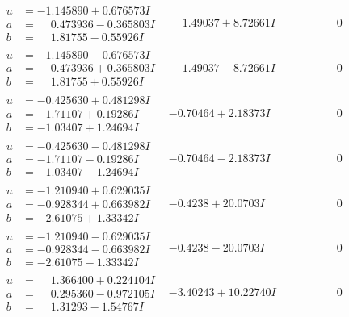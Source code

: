 \documentclass[1p]{elsarticle_modified}
\theoremstyle{definition}
\begin{document}
$$\begin{array}{c|c|c}
\begin{aligned}
u &= -1.145890 + 0.676573 I \\
a &= \phantom{-}0.473936 - 0.365803 I \\
b &= \phantom{-}1.81755 - 0.55926 I\end{aligned}
 & \phantom{-}1.49037 + 8.72661 I & \phantom{-0.000000 } 0 \\ \hline\begin{aligned}
u &= -1.145890 - 0.676573 I \\
a &= \phantom{-}0.473936 + 0.365803 I \\
b &= \phantom{-}1.81755 + 0.55926 I\end{aligned}
 & \phantom{-}1.49037 - 8.72661 I & \phantom{-0.000000 } 0 \\ \hline\begin{aligned}
u &= -0.425630 + 0.481298 I \\
a &= -1.71107 + 0.19286 I \\
b &= -1.03407 + 1.24694 I\end{aligned}
 & -0.70464 + 2.18373 I & \phantom{-0.000000 } 0 \\ \hline\begin{aligned}
u &= -0.425630 - 0.481298 I \\
a &= -1.71107 - 0.19286 I \\
b &= -1.03407 - 1.24694 I\end{aligned}
 & -0.70464 - 2.18373 I & \phantom{-0.000000 } 0 \\ \hline\begin{aligned}
u &= -1.210940 + 0.629035 I \\
a &= -0.928344 + 0.663982 I \\
b &= -2.61075 + 1.33342 I\end{aligned}
 & -0.4238 + 20.0703 I & \phantom{-0.000000 } 0 \\ \hline\begin{aligned}
u &= -1.210940 - 0.629035 I \\
a &= -0.928344 - 0.663982 I \\
b &= -2.61075 - 1.33342 I\end{aligned}
 & -0.4238 - 20.0703 I & \phantom{-0.000000 } 0 \\ \hline\begin{aligned}
u &= \phantom{-}1.366400 + 0.224104 I \\
a &= \phantom{-}0.295360 - 0.972105 I \\
b &= \phantom{-}1.31293 - 1.54767 I\end{aligned}
 & -3.40243 + 10.22740 I & \phantom{-0.000000 } 0 \\ \hline\begin{aligned}

\end{aligned}
\end{array}$$
\end{document}
